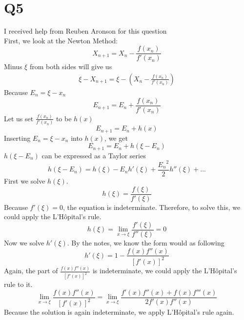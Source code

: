 \documentclass{article}
\begin{document}
\section{Q5}
I received help from Reuben Aronson for this question\\
First, we look at the Newton Method:
\begin{equation*}
X_{n+1} = X_{n} - \frac{f(x_n)}{f'(x_n)}
\end{equation*}
Minus $\xi$ from both sides will give us
\begin{equation*}
\begin{aligned}
\xi - X_{n+1} = \xi - (X_{n} - \frac{f(x_n)}{f'(x_n)})
\end{aligned}
\end{equation*}
Because $E_n = \xi - x_n$
\begin{equation*}
E_{n+1} = E_n + \frac{f(x_n)}{f'(x_n)}
\end{equation*}
Let us set $\frac{f(x_n)}{f'(x_n)}$ to be $h(x)$
\begin{equation*}
E_{n+1} = E_n + h(x)
\end{equation*}
Inserting $E_n = \xi - x_n$ into $h(x)$, we get
\begin{equation*}
E_{n+1} = E_n + h(\xi - E_n)
\end{equation*}
$h(\xi - E_n)$ can be expressed as a Taylor series
\begin{equation*}
h(\xi - E_n) = h(\xi) - E_nh'(\xi) + \frac{{E_n}^2}{2}h''(\xi) + ...
\end{equation*}
First we solve $h(\xi)$.
\begin{equation*}
h(\xi) =\frac{f(\xi)}{f'(\xi)}
\end{equation*}
Because $f'(\xi) = 0$, the equation is indeterminate. Therefore, to solve this, we could apply the L'H\^opital's rule.
\begin{equation*}
h(\xi) = \lim_{x\to\xi}\frac{f'(\xi)}{f''(\xi)} = 0
\end{equation*}
Now we solve $h'(\xi)$. By the notes, we know the form would as following
\begin{equation*}
h'(\xi) = 1 - \frac{f(x)f''(x)}{[f'(x)]^2}
\end{equation*}
Again, the part of $\frac{f(x)f''(x)}{[f'(x)]^2}$ is indeterminate, we could apply the L'H\^opital's rule to it.
\begin{equation*}
\lim_{x\to\xi} \frac{f(x)f''(x)}{[f'(x)]^2} = \lim_{x\to\xi} \frac{f'(x)f''(x) + f(x)f'''(x)}{2f'(x)f''(x)}
\end{equation*}
Because the solution is again indeterminate, we apply L'H\^opital's rule again.
\end{document}
